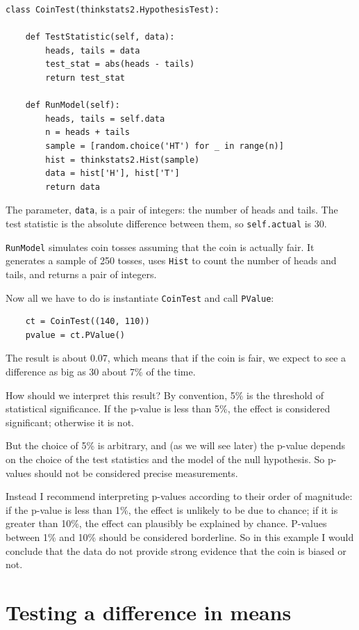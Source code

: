 \documentclass[12pt]{book}
\begin{document}
\begin{verbatim}
class CoinTest(thinkstats2.HypothesisTest):

    def TestStatistic(self, data):
        heads, tails = data
        test_stat = abs(heads - tails)
        return test_stat

    def RunModel(self):
        heads, tails = self.data
        n = heads + tails
        sample = [random.choice('HT') for _ in range(n)]
        hist = thinkstats2.Hist(sample)
        data = hist['H'], hist['T']
        return data
\end{verbatim}

The parameter, {\tt data}, is a pair of
integers: the number of heads and tails.  The test statistic is
the absolute difference between them, so {\tt self.actual}
is 30.

{\tt RunModel} simulates coin tosses assuming that the coin is
actually fair.  It generates a sample of 250 tosses, uses {\tt Hist}
to count the number of heads and tails, and returns a pair of
integers.

Now all we have to do is instantiate {\tt CoinTest} and call
{\tt PValue}:

\begin{verbatim}
    ct = CoinTest((140, 110))
    pvalue = ct.PValue()
\end{verbatim}

The result is about 0.07, which means that if the coin is
fair, we expect to see a difference as big as 30 about 7\% of the
time.

How should we interpret this result?  By convention,
5\% is the threshold of statistical significance.  If the
p-value is less than 5\%, the effect is considered significant; otherwise
it is not.

But the choice of 5\% is arbitrary, and (as we will see later) the
p-value depends on the choice of the test statistics and
the model of the null hypothesis.  So p-values should not be considered
precise measurements.

Instead I recommend interpreting p-values according to their order of
magnitude: if the p-value is less than 1\%, the effect is unlikely to
be due to chance; if it is greater than 10\%, the effect can plausibly
be explained by chance.  P-values between 1\% and 10\% should be
considered borderline.  So in this example I would conclude that the
data do not provide strong evidence that the coin is biased or not.


\section{Testing a difference in means}
\label{testdiff}
\end{document}
